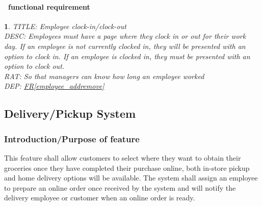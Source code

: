 \documentclass{scrreprt}
\theoremstyle{funreq}
\newtheorem{funreq}{}
\newcommand*{\reqref}[1]{\hyperref[#1]{FR\ref*{#1}}}
\begin{document}
	\paragraph[]{\Subsectionname ~functional requirement }
	\begin{funreq}
		\label{employee_clock}
		TITLE: Employee clock-in/clock-out\\
		DESC: Employees must have a page where they clock in or out for their work day.  If an employee is not currently clocked in, they will be presented with an option to clock in.  If an employee is clocked in, they must be presented with an option to clock out.\\
		RAT: So that managers can know how long an employee worked\\
		DEP: \reqref{employee_addremove}
	\end{funreq}
	
	\subsection{Delivery/Pickup System}
	\subsubsection{Introduction/Purpose of feature}
    This feature shall allow customers to select where they want to obtain their groceries once they have completed their purchase online, both in-store pickup and home delivery options will be available. The system shall assign an employee to prepare an online order once received by the system and will notify the delivery employee or customer when an online order is ready.

	\raggedbottom
	
\end{document}

